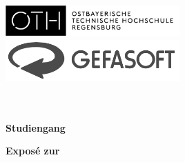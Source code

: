 


\begin{titlepage}

\vspace*{-30pt}
\includegraphics[width=0.5\textwidth]{images/Unbenannt}
\hfill\includegraphics[width=0.5\textwidth]{images/logo_firma}
\vspace{20pt}

\centering
\Large
{}
\textbf{\getInstitute}\\
\large
\textbf{\getModule}\\
\normalsize
\textbf{Studiengang \getStudSubject}

\vspace{60pt}
\huge
\textbf{Exposé zur}

\Huge
\textbf{\getWorkType}

\normalsize

\textmd{\getAuthor}
\vspace{20pt}

\Large
\textbf{\getTitle}

\vspace{20pt}

\normalsize





\end{titlepage}
